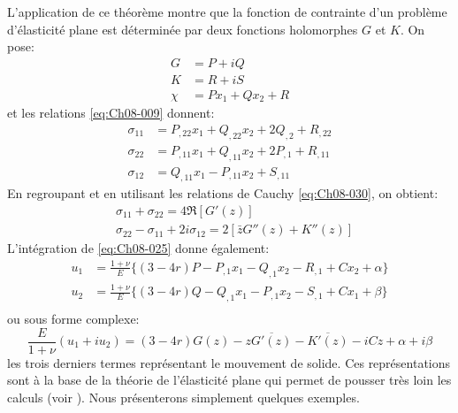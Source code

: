 L'application de ce théorème montre que la fonction de contrainte d'un problème d'élasticité plane est déterminée par deux fonctions holomorphes $G$ et $K$.
On pose: 
\begin{equation}
  \begin{aligned}
    G    & = P + i Q \\
    K    & = R + i S \\
    \chi & = Px_1 + Qx_2 + R
  \end{aligned}
\label{eq:Ch08-031}
\end{equation}
et les relations \eqref{eq:Ch08-009} donnent: 
\begin{equation}
  \begin{aligned}
    \sigma_{11} & = P_{,22} x_1 + Q_{,22} x_2 + 2 Q_{,2} + R_{,22} \\
    \sigma_{22} & = P_{,11} x_1 + Q_{,11} x_2 + 2 P_{,1} + R_{,11} \\
    \sigma_{12} & = Q_{,11} x_1 - P_{,11} x_2 + S_{,11}
  \end{aligned}
\label{eq:Ch08-032}
\end{equation}
En regroupant et en utilisant les relations de Cauchy \eqref{eq:Ch08-030}, on obtient: 
\begin{equation}
    \begin{aligned}
        &\sigma_{11} + \sigma_{22} = 4 \Re \left[ G'(z) \right] \\
        &\sigma_{22} - \sigma_{11} + 2 i \sigma_{12} = 2 \left[ \bar{z}G''(z) + K''(z) \right]
    \end{aligned}
    \label{eq:Ch08-033}
\end{equation}
L'intégration de \eqref{eq:Ch08-025} donne également: 
\begin{equation}
  \begin{aligned}
    u_1 & = \frac{1+\nu}{E}\{(3-4r)P - P_{,1}x_1 - Q_{,1}x_2 - R_{,1} + Cx_2 + \alpha \}\\
    u_2 & = \frac{1+\nu}{E}\{(3-4r)Q - Q_{,1}x_1 - P_{,1}x_2 - S_{,1} + Cx_1 + \beta \}\\
  \end{aligned}
\label{eq:Ch08-034}
\end{equation}
ou sous forme complexe: 
\begin{equation}
    \frac{E}{1+\nu}(u_1 + i u_2) = (3-4r)G(z) - z\overline{G'(z)} - \overline{K'(z)} - i C z + \alpha +i\beta
    \label{eq:Ch08-035}
\end{equation}
les trois derniers termes représentant le mouvement de solide. 
Ces représentations sont à la base de la théorie de l'élasticité plane qui permet de pousser très loin les calculs (voir \cite{Muskhelishvili-53}). 
Nous présenterons simplement quelques exemples.

